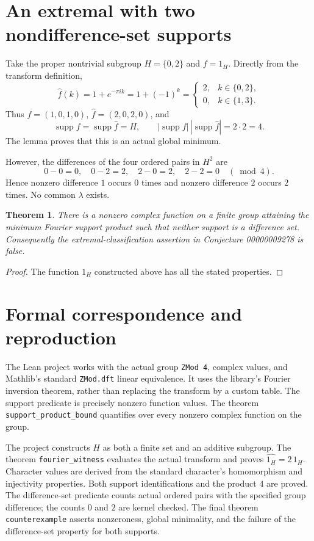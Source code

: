 \documentclass[11pt]{article}
\newtheorem{theorem}{Theorem}
\newcommand{\supp}{\operatorname{supp}}
\begin{document}
\section*{An extremal with two nondifference-set supports}
Take the proper nontrivial subgroup $H=\{0,2\}$ and $f=1_H$.
Directly from the transform definition,
\[
 \widehat f(k)=1+e^{-\pi i k}=1+(-1)^k
       =\begin{cases}2,&k\in\{0,2\},\\0,&k\in\{1,3\}.
         \end{cases}
\]
Thus $f=(1,0,1,0)$, $\widehat f=(2,0,2,0)$, and
\[
 \supp f=\supp\widehat f=H,\qquad
 |\supp f|\,|\supp\widehat f|=2\cdot2=4.
\]
The lemma proves that this is an actual global minimum.

However, the differences of the four ordered pairs in $H^2$ are
\[
 0-0=0,\quad 0-2=2,\quad 2-0=2,\quad 2-2=0
                   \quad(\bmod 4).
\]
Hence nonzero difference $1$ occurs $0$ times and nonzero difference
$2$ occurs $2$ times. No common $\lambda$ exists.

\begin{theorem}
There is a nonzero complex function on a finite group attaining the
minimum Fourier support product such that neither support is a
difference set. Consequently the extremal-classification assertion
in Conjecture 00000009278 is false.
\end{theorem}
\begin{proof}
The function $1_H$ constructed above has all the stated properties.
\end{proof}

\section*{Formal correspondence and reproduction}
The Lean project works with the actual group \texttt{ZMod 4}, complex
values, and Mathlib's standard \texttt{ZMod.dft} linear equivalence.
It uses the library's Fourier inversion theorem, rather than replacing
the transform by a custom table. The support predicate is precisely
nonzero function values. The theorem \texttt{support\_product\_bound}
quantifies over every nonzero complex function on the group.

The project constructs $H$ as both a finite set and an additive
subgroup. The theorem \texttt{fourier\_witness} evaluates the actual
transform and proves $\widehat{1_H}=2\,1_H$. Character values are
derived from the standard character's homomorphism and injectivity
properties. Both support identifications and the product $4$ are
proved. The difference-set predicate counts actual ordered pairs
with the specified group difference; the counts $0$ and $2$ are
kernel checked. The final theorem \texttt{counterexample} asserts
nonzeroness, global minimality, and the failure of the difference-set
property for both supports.
\end{document}
